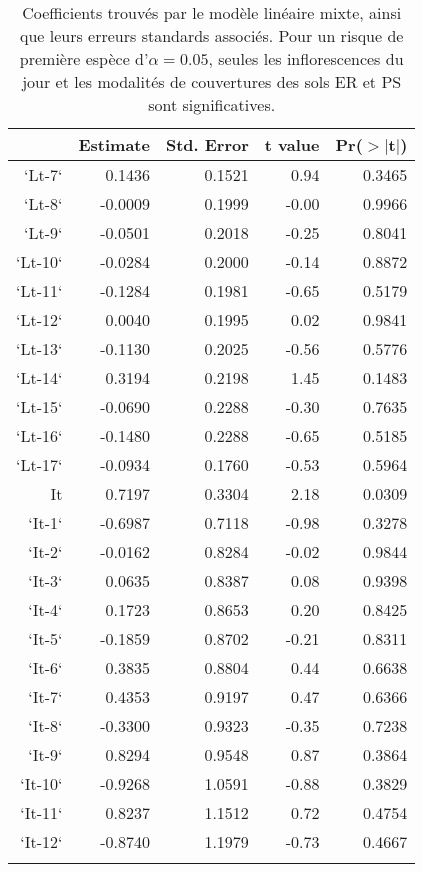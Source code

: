 \documentclass[a4paper, 11pt]{article}
\begin{document}
\begin{table}[ht]
\centering
\caption{Coefficients trouvés par le modèle linéaire mixte, ainsi que leurs erreurs standards associés. Pour un risque de première espèce d'$\alpha = 0.05$, seules les inflorescences du jour et les modalités de couvertures des sols ER et PS sont significatives.}
\label{tab:mml}
\begin{tabular}{rrrrr}
 & Estimate & Std. Error & t value & Pr($>$$|$t$|$) \\ 
  \hline
`Lt-7` & 0.1436 & 0.1521 & 0.94 & 0.3465 \\ 
  `Lt-8` & -0.0009 & 0.1999 & -0.00 & 0.9966 \\ 
  `Lt-9` & -0.0501 & 0.2018 & -0.25 & 0.8041 \\ 
  `Lt-10` & -0.0284 & 0.2000 & -0.14 & 0.8872 \\ 
  `Lt-11` & -0.1284 & 0.1981 & -0.65 & 0.5179 \\ 
  `Lt-12` & 0.0040 & 0.1995 & 0.02 & 0.9841 \\ 
  `Lt-13` & -0.1130 & 0.2025 & -0.56 & 0.5776 \\ 
  `Lt-14` & 0.3194 & 0.2198 & 1.45 & 0.1483 \\ 
  `Lt-15` & -0.0690 & 0.2288 & -0.30 & 0.7635 \\ 
  `Lt-16` & -0.1480 & 0.2288 & -0.65 & 0.5185 \\ 
  `Lt-17` & -0.0934 & 0.1760 & -0.53 & 0.5964 \\ 
  It & 0.7197 & 0.3304 & 2.18 & 0.0309 \\ 
  `It-1` & -0.6987 & 0.7118 & -0.98 & 0.3278 \\ 
  `It-2` & -0.0162 & 0.8284 & -0.02 & 0.9844 \\ 
  `It-3` & 0.0635 & 0.8387 & 0.08 & 0.9398 \\ 
  `It-4` & 0.1723 & 0.8653 & 0.20 & 0.8425 \\ 
  `It-5` & -0.1859 & 0.8702 & -0.21 & 0.8311 \\ 
  `It-6` & 0.3835 & 0.8804 & 0.44 & 0.6638 \\ 
  `It-7` & 0.4353 & 0.9197 & 0.47 & 0.6366 \\ 
  `It-8` & -0.3300 & 0.9323 & -0.35 & 0.7238 \\ 
  `It-9` & 0.8294 & 0.9548 & 0.87 & 0.3864 \\ 
  `It-10` & -0.9268 & 1.0591 & -0.88 & 0.3829 \\ 
  `It-11` & 0.8237 & 1.1512 & 0.72 & 0.4754 \\ 
  `It-12` & -0.8740 & 1.1979 & -0.73 & 0.4667 \\ 
$$
\end{tabular}
\end{table}
\end{document}
